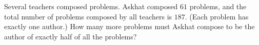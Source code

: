 Several teachers composed problems. Askhat composed $61$ problems, and the total number of problems composed by all teachers is $187$. (Each problem has exactly one author.) How many more problems must Askhat compose to be the author of exactly half of all the problems?
